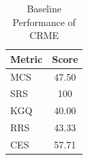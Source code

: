 \begin{table}[htbp]
\centering
\caption{Baseline Performance of CRME}
\label{tab:crme-baseline-performance}
\begin{tabular}{lc}
\toprule
Metric & Score \\
\midrule
MCS & 47.50 \\
SRS & 100 \\
KGQ & 40.00 \\
RRS & 43.33 \\
CES & 57.71 \\
\bottomrule
\end{tabular}
\end{table}